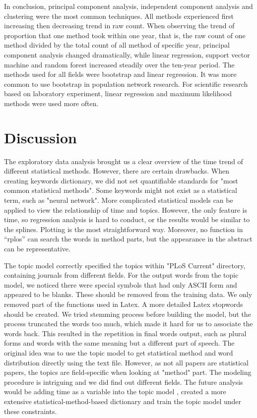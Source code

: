 \documentclass[11pt]{article}
\begin{document}
In conclusion, principal component analysis, independent component analysis and clustering were the most common techniques. All methods experienced first increasing then decreasing trend in raw count. When observing the trend of proportion that one method took within one year, that is, the raw count of one method divided by the total count of all method of specific year, principal component analysis changed dramatically, while linear regression, support vector machine and random forest increased steadily over the ten-year period. The methods used for all fields were bootstrap and linear regression. It was more common to use bootstrap in population network research. For scientific research based on laboratory experiment, linear regression and maximum likelihood methods were used more often. 



\section{Discussion}

The exploratory data analysis brought us a clear overview of the time trend of different statistical methods. However, there are certain drawbacks. When creating keywords dictionary, we did not set quantifiable standards for "most common statistical methods". Some keywords might not exist as a statistical term, such as "neural network". More complicated statistical models can be applied to view the relationship of time and topics. However, the only feature is time, so regression analysis is hard to conduct, or the results would be similar to the splines. Plotting is the most straightforward way. Moreover, no function in “rplos” can search the words in method parts, but the appearance in the abstract can be representative. 

The topic model correctly specified the topics within "PLoS Current" directory, containing journals from different fields. For the output words from the topic model, we noticed there were special symbols that had only ASCII form and appeared to be blanks. These should be removed from the training data. We only removed part of the functions used in Latex. A more detailed Latex stopwords should be created. We tried stemming process before building the model, but the process truncated the words too much, which made it hard for us to associate the words back. This resulted in the repetition in final words output, such as plural forms and words with the same meaning but a different part of speech. The original idea was to use the topic model to get statistical method and word distribution directly using the text file. However, as not all papers are statistical papers, the topics are field-specific when looking at "method" part. The modeling procedure is intriguing and we did find out different fields. The future analysis would be adding time as a variable into the topic model \cite{topicovertime}, created a more extensive statistical-method-based dictionary and train the topic model under these constraints. 
\end{document}
